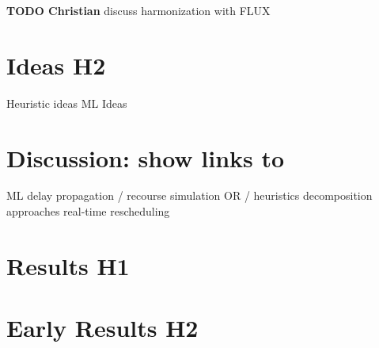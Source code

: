 \documentclass{article}
\begin{document}
\begin{mdframed}
{\bf TODO Christian} discuss harmonization with FLUX
\end{mdframed}


\section{Ideas H2}\label{sec:H2}
        Heuristic ideas
        ML Ideas

\section{Discussion: show links to}
        ML
        delay propagation / recourse
        simulation
        OR / heuristics
        decomposition approaches
        real-time rescheduling


\section{Results H1}\label{sec:ResultsH1}



\section{Early Results H2}





\end{document}

